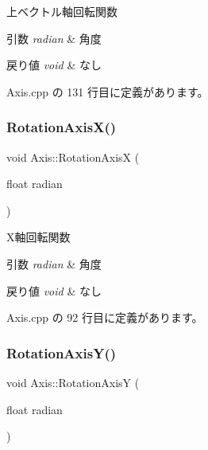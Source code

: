 上ベクトル軸回転関数 


\begin{DoxyParams}{引数}
{\em radian} & 角度 \\
\hline
\end{DoxyParams}

\begin{DoxyRetVals}{戻り値}
{\em void} & なし \\
\hline
\end{DoxyRetVals}


 Axis.\+cpp の 131 行目に定義があります。

\mbox{\label{class_axis_a74c734b0145fe83813c139cc731b5bce}} 
\subsubsection{\texorpdfstring{Rotation\+Axis\+X()}{RotationAxisX()}}
{\footnotesize\ttfamily void Axis\+::\+Rotation\+AxisX (\begin{DoxyParamCaption}\item[{float}]{radian }\end{DoxyParamCaption})}



X軸回転関数 


\begin{DoxyParams}{引数}
{\em radian} & 角度 \\
\hline
\end{DoxyParams}

\begin{DoxyRetVals}{戻り値}
{\em void} & なし \\
\hline
\end{DoxyRetVals}


 Axis.\+cpp の 92 行目に定義があります。

\mbox{\label{class_axis_acb5217738982de2c3695ef0802b14a6c}} 
\subsubsection{\texorpdfstring{Rotation\+Axis\+Y()}{RotationAxisY()}}
{\footnotesize\ttfamily void Axis\+::\+Rotation\+AxisY (\begin{DoxyParamCaption}\item[{float}]{radian }\end{DoxyParamCaption})}



